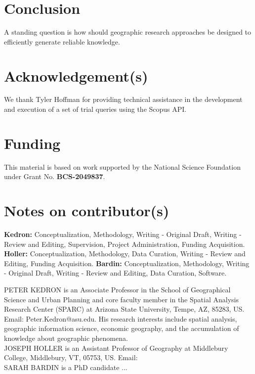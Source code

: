 \documentclass[]{interact}
\theoremstyle{plain}%
\theoremstyle{definition}
\theoremstyle{remark}
\begin{document}
\section*{Conclusion}
A standing question is how should geographic research approaches be designed to efficiently generate reliable knowledge.

\theendnotes


\section*{Acknowledgement(s)}
We thank Tyler Hoffman for providing technical assistance in the development and execution of a set of trial queries using the Scopus API.

\section*{Funding}
This material is based on work supported by the National Science Foundation under Grant No. \textbf{BCS-2049837}.

\section*{Notes on contributor(s)}
\textbf{Kedron:} Conceptualization, Methodology, Writing - Original Draft, Writing - Review and Editing, Supervision, Project Administration, Funding Acquisition. \textbf{Holler:} Conceptualization, Methodology, Data Curation, Writing - Review and Editing, Funding Acquisition. \textbf{Bardin:} Conceptualization, Methodology, Writing - Original Draft, Writing - Review and Editing, Data Curation, Software.



\newpage


\newpage
\noindent PETER KEDRON is an Associate Professor in the School of Geographical Science and Urban Planning and core faculty member in the Spatial Analysis Research Center (SPARC) at Arizona State University, Tempe, AZ, 85283, US. Email: Peter.Kedron@asu.edu. His research interests include spatial analysis, geographic information science, economic geography, and the accumulation of knowledge about geographic phenomena. \\  
  
\noindent JOSEPH HOLLER is an Assistant Professor of Geography at Middlebury College, Middlebury, VT, 05753, US. Email: \\
  
\noindent SARAH BARDIN is a PhD candidate ...
\end{document}
